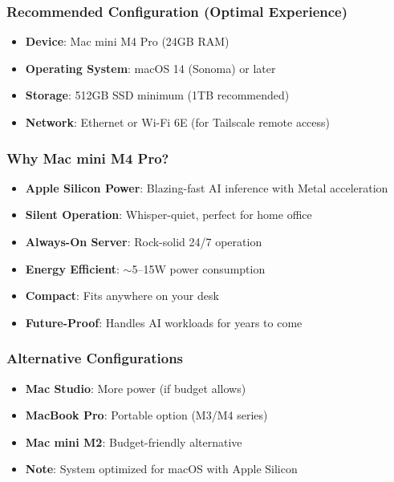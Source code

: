 \documentclass[11pt,letterpaper]{article}
\begin{document}
\subsubsection{Recommended Configuration (Optimal Experience)}
\begin{itemize}[leftmargin=*]
    \item \textbf{Device}: Mac mini M4 Pro (24GB RAM)
    \item \textbf{Operating System}: macOS 14 (Sonoma) or later
    \item \textbf{Storage}: 512GB SSD minimum (1TB recommended)
    \item \textbf{Network}: Ethernet or Wi-Fi 6E (for Tailscale remote access)
\end{itemize}

\subsubsection{Why Mac mini M4 Pro?}
\begin{itemize}[leftmargin=*]
    \item \textbf{Apple Silicon Power}: Blazing-fast AI inference with Metal acceleration
    \item \textbf{Silent Operation}: Whisper-quiet, perfect for home office
    \item \textbf{Always-On Server}: Rock-solid 24/7 operation
    \item \textbf{Energy Efficient}: $\sim$5--15W power consumption
    \item \textbf{Compact}: Fits anywhere on your desk
    \item \textbf{Future-Proof}: Handles AI workloads for years to come
\end{itemize}

\subsubsection{Alternative Configurations}
\begin{itemize}[leftmargin=*]
    \item \textbf{Mac Studio}: More power (if budget allows)
    \item \textbf{MacBook Pro}: Portable option (M3/M4 series)
    \item \textbf{Mac mini M2}: Budget-friendly alternative
    \item \textbf{Note}: System optimized for macOS with Apple Silicon
\end{itemize}
\end{document}
